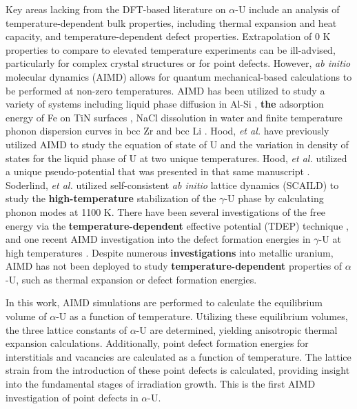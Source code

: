 \documentclass[utf8]{frontiersSCNS} %
\providecommand{\DIFaddtex}[1]{{\bf #1}} %
\providecommand{\DIFdeltex}[1]{} %
\providecommand{\DIFaddbegin}{\protect\color{blue}} %
\providecommand{\DIFaddend}{\protect\color{black}} %
\providecommand{\DIFdelbegin}{\protect\color{red}} %
\providecommand{\DIFdelend}{\protect\color{black}} %
\providecommand{\DIFadd}[1]{\texorpdfstring{\DIFaddtex{#1}}{#1}} %
\providecommand{\DIFdel}[1]{\texorpdfstring{\DIFdeltex{#1}}{}} %
\begin{document}
Key areas lacking from the DFT-based literature on $\alpha$-U include an analysis of temperature-dependent bulk properties, including thermal expansion and heat capacity, and temperature-dependent defect properties. Extrapolation of 0 K properties to compare to elevated temperature experiments can be ill-advised, particularly for complex crystal structures or for point defects. However, \textit{ab initio} molecular dynamics (AIMD) allows for quantum mechanical-based calculations to be performed at non-zero temperatures. AIMD has been utilized to study a variety of systems including liquid phase diffusion in Al-Si \cite{manga2018}, \DIFaddbegin \DIFadd{the }\DIFaddend adsorption energy of Fe on TiN surfaces \cite{wang2010}, NaCl dissolution in water \cite{timko2010} and finite temperature phonon dispersion curves in bcc Zr and bcc Li \cite{hellman2011}. Hood, \textit{et al.} \cite{hood2008} have previously utilized AIMD to study the equation of state of U and the variation in density of states for the liquid phase of U at two unique temperatures. Hood, \textit{et al.} utilized a unique pseudo-potential that was presented in that same manuscript \cite{hood2008}. Soderlind, \textit{et al.} \cite{soderlind2012} utilized self-consistent \textit{ab initio} lattice dynamics (SCAILD) to study the \DIFdelbegin \DIFdel{high temperature }\DIFdelend \DIFaddbegin \DIFadd{high-temperature }\DIFaddend stabilization of the $\gamma$-U phase by calculating phonon modes at 1100 K. There have been several investigations of the free energy via the \DIFdelbegin \DIFdel{temperature dependent }\DIFdelend \DIFaddbegin \DIFadd{temperature-dependent }\DIFaddend effective potential (TDEP) technique \cite{hellman2013, ladygin2020, kruglov2019, bouchet2017, castellano2020}, and one recent AIMD investigation into the defect formation energies in $\gamma$-U at high temperatures \cite{beelerAIMD}. Despite numerous \DIFdelbegin \DIFdel{investigated }\DIFdelend \DIFaddbegin \DIFadd{investigations }\DIFaddend into metallic uranium, AIMD has not been deployed to study \DIFdelbegin \DIFdel{temperature dependent }\DIFdelend \DIFaddbegin \DIFadd{temperature-dependent }\DIFaddend properties of $\alpha$-U, such as thermal expansion or defect formation energies. 

In this work, AIMD simulations are performed to calculate the equilibrium volume of $\alpha$-U as a function of temperature. Utilizing these equilibrium volumes, the three lattice constants of $\alpha$-U are determined, yielding anisotropic thermal expansion calculations. Additionally, point defect formation energies for interstitials and vacancies are calculated as a function of temperature. The lattice strain from the introduction of these point defects is calculated, providing insight into the fundamental stages of irradiation growth. This is the first AIMD investigation of point defects in $\alpha$-U. 
\end{document}
